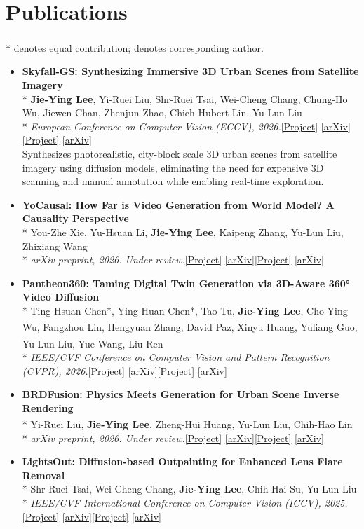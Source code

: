 \documentclass[a4paper,10pt]{extarticle}
\newcommand{\link}[2]{\href{#1}{\color{accent}[#2]}}
\newenvironment{cvlist}
  {\begin{itemize}[leftmargin=1em, itemsep=2pt, topsep=0pt, parsep=0pt, label=\textbullet]}
  {\end{itemize}}
\newcommand{\pub}[4]{%
  \item \textbf{#1}\\*
  #2\\*
  {\small\textit{#3}\ifx\relax#4\relax\else\quad #4\fi}}
\begin{document}
\section{Publications}
{\footnotesize\color{subtle} * denotes equal contribution; \textsuperscript{\dag} denotes corresponding author.}\vspace{2pt}
\begin{cvlist}
\pub{Skyfall-GS: Synthesizing Immersive 3D Urban Scenes from Satellite Imagery}
    {\textbf{Jie-Ying Lee}, Yi-Ruei Liu, Shr-Ruei Tsai, Wei-Cheng Chang, Chung-Ho Wu, Jiewen Chan, Zhenjun Zhao, Chieh Hubert Lin, Yu-Lun Liu}
    {European Conference on Computer Vision (ECCV), 2026.}
    {\link{https://skyfall-gs.jayinnn.dev/}{Project} \link{https://arxiv.org/abs/2510.15869}{arXiv}}\\
    {Synthesizes photorealistic, city-block scale 3D urban scenes from satellite imagery using diffusion models, eliminating the need for expensive 3D scanning and manual annotation while enabling real-time exploration.}

\pub{YoCausal: How Far is Video Generation from World Model? A Causality Perspective}
    {You-Zhe Xie, Yu-Hsuan Li, \textbf{Jie-Ying Lee}, Kaipeng Zhang, Yu-Lun Liu, Zhixiang Wang}
    {arXiv preprint, 2026. Under review.}
    {\link{https://www.youzhexie.me/papers/YoCausal/index.html}{Project} \link{https://arxiv.org/abs/2605.30346}{arXiv}}

\pub{Pantheon360: Taming Digital Twin Generation via 3D-Aware 360° Video Diffusion}
    {Ting-Hsuan Chen*, Ying-Huan Chen*, Tao Tu, \textbf{Jie-Ying Lee}, Cho-Ying Wu, Fangzhou Lin, Hengyuan Zhang, David Paz, Xinyu Huang, Yuliang Guo\textsuperscript{\dag}, Yu-Lun Liu\textsuperscript{\dag}, Yue Wang\textsuperscript{\dag}, Liu Ren}
    {IEEE/CVF Conference on Computer Vision and Pattern Recognition (CVPR), 2026.}
    {\link{https://koi953215.github.io/pantheon360_page/}{Project} \link{https://arxiv.org/abs/2605.25449}{arXiv}}

\pub{BRDFusion: Physics Meets Generation for Urban Scene Inverse Rendering}
    {Yi-Ruei Liu, \textbf{Jie-Ying Lee}, Zheng-Hui Huang, Yu-Lun Liu\textsuperscript{\dag}, Chih-Hao Lin\textsuperscript{\dag}}
    {arXiv preprint, 2026. Under review.}
    {\link{https://shigon255.github.io/brdfusion-page/}{Project} \link{https://arxiv.org/abs/2606.17049}{arXiv}}

\pub{LightsOut: Diffusion-based Outpainting for Enhanced Lens Flare Removal}
    {Shr-Ruei Tsai, Wei-Cheng Chang, \textbf{Jie-Ying Lee}, Chih-Hai Su, Yu-Lun Liu}
    {IEEE/CVF International Conference on Computer Vision (ICCV), 2025.}
    {\link{https://ray-1026.github.io/lightsout/}{Project} \link{https://arxiv.org/abs/2510.15868}{arXiv}}


\end{cvlist}
\end{document}
